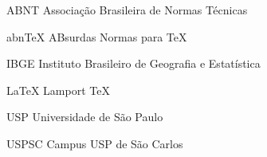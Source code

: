\begin{siglas}
    \item[ABNT] Associação Brasileira de Normas T\'ecnicas
    \item[abnTeX] ABsurdas Normas para TeX
	\item[IBGE] Instituto Brasileiro de Geografia e Estatística
	\item[LaTeX] Lamport TeX
	\item[USP] Universidade de São Paulo
	\item[USPSC] Campus USP de São Carlos
\end{siglas}
